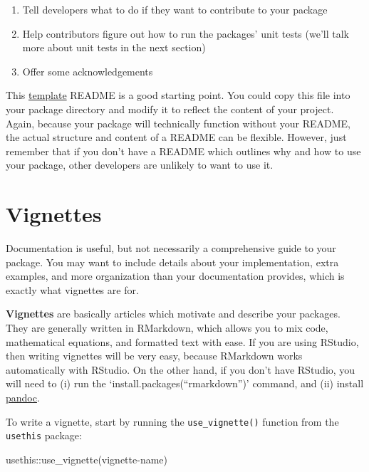 \documentclass[
]{book}
\newenvironment{Shaded}{\begin{snugshade}}{\end{snugshade}}
\newcommand{\FunctionTok}[1]{\textcolor[rgb]{0.00,0.00,0.00}{#1}}
\newcommand{\NormalTok}[1]{#1}
\newcommand{\SpecialCharTok}[1]{\textcolor[rgb]{0.00,0.00,0.00}{#1}}
\newcommand{\StringTok}[1]{\textcolor[rgb]{0.31,0.60,0.02}{#1}}
\providecommand{\tightlist}{%
  \setlength{\itemsep}{0pt}\setlength{\parskip}{0pt}}
\begin{document}
\begin{enumerate}
\def\labelenumi{\arabic{enumi}.}
\setcounter{enumi}{2}
\tightlist
\item
  Tell developers what to do if they want to contribute to your package
\item
  Help contributors figure out how to run the packages' unit tests (we'll talk more about unit tests in the next section)
\item
  Offer some acknowledgements
\end{enumerate}

This \href{https://gist.github.com/PurpleBooth/109311bb0361f32d87a2}{template} README is a good starting point. You could copy this file into your package directory and modify it to reflect the content of your project. Again, because your package will technically function without your README, the actual structure and content of a README can be flexible. However, just remember that if you don't have a README which outlines why and how to use your package, other developers are unlikely to want to use it.

\hypertarget{vignettes}{%
\section{Vignettes}\label{vignettes}}

Documentation is useful, but not necessarily a comprehensive guide to your package. You may want to include details about your implementation, extra examples, and more organization than your documentation provides, which is exactly what vignettes are for.

\textbf{Vignettes} are basically articles which motivate and describe your packages. They are generally written in RMarkdown, which allows you to mix code, mathematical equations, and formatted text with ease. If you are using RStudio, then writing vignettes will be very easy, because RMarkdown works automatically with RStudio. On the other hand, if you don't have RStudio, you will need to (i) run the `install.packages(``rmarkdown'')' command, and (ii) install \href{http://pandoc.org/installing.html}{pandoc}.

To write a vignette, start by running the \texttt{use\_vignette()} function from the \texttt{usethis} package:

\begin{Shaded}
\begin{Highlighting}[]
\NormalTok{usethis}\SpecialCharTok{::}\FunctionTok{use\_vignette}\NormalTok{(}\StringTok{\textquotesingle{}vignette{-}name\textquotesingle{}}\NormalTok{)}
\end{Highlighting}
\end{Shaded}
\end{document}
